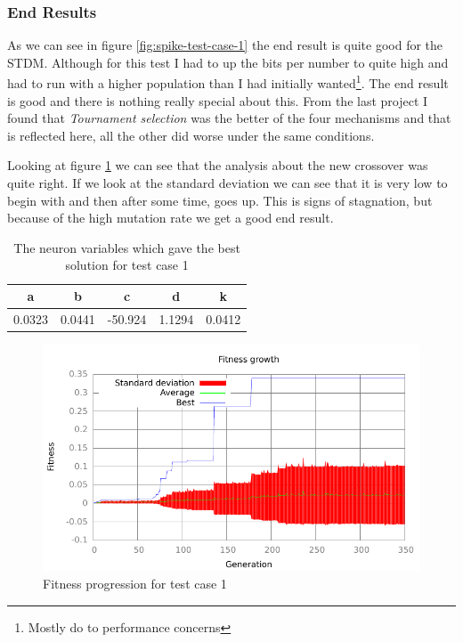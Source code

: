 \subsubsection{End Results}\label{sec:test-case-1-results}
As we can see in figure \ref{fig:spike-test-case-1} the end result is quite good
for the STDM. Although for this test I had to up the bits per number to quite
high and had to run with a higher population than I had initially
wanted\footnote{Mostly do to performance concerns}. The end result is good and
there is nothing really special about this. From the last project I found that
\textit{Tournament selection} was the better of the four mechanisms and that is
reflected here, all the other did worse under the same conditions.

Looking at figure \ref{fig:fitness-test-case-1} we can see that the analysis
about the new crossover was quite right. If we look at the standard deviation we
can see that it is very low to begin with and then after some time, goes up. This
is signs of stagnation, but because of the high mutation rate we get a good end
result.
\begin{table}[h]
	\begin{tabular}{c c c c c}
		a & b & c & d & k \\
		\hline
		0.0323 & 0.0441 & -50.924 & 1.1294 & 0.0412
	\end{tabular}
	\caption{The neuron variables which gave the best solution for test case
	1}
\end{table}
\begin{figure}[h]
	\centering
	\includegraphics{../output/stdm_izzy_1_fitness.pdf}
	\caption{Fitness progression for test case 1}
	\label{fig:fitness-test-case-1}
\end{figure}
